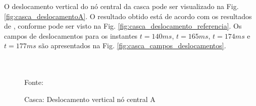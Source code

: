 \documentclass[tese_patricia]{subfiles}
\begin{document}
O deslocamento vertical do nó central da casca pode ser visualizado na Fig. \ref{fig:casca_deslocamentoA}. O resultado obtido está de acordo com os resultados de , conforme pode ser visto na Fig. \ref{fig:casca_deslocamento_referencia}. Os campos de deslocamentos para os instantes $t = 140ms$, $t = 165ms$, $t = 174ms$ e $t = 177ms$ são apresentados na Fig. \ref{fig:casca_campos_deslocamentos}.


\begin{figure}[!htb]
	\centering
	 \\
	\\
	Fonte: 
	\caption{Casca: Deslocamento vertical nó central A}
	\label{fig:casca_deslocamento_no_central}
\end{figure}
\end{document}
